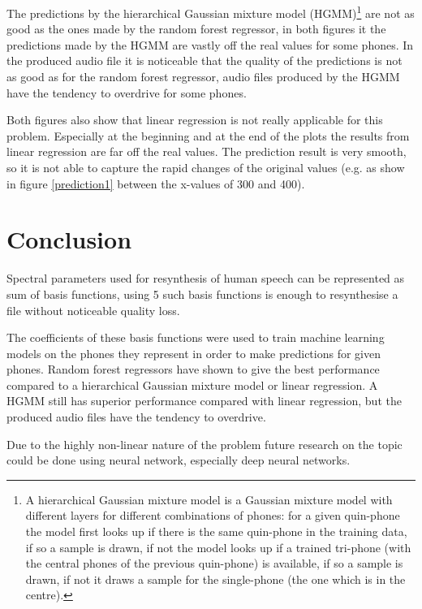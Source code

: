 \documentclass{article}
\begin{document}
The predictions by the hierarchical Gaussian mixture model (HGMM)\footnote{A 
hierarchical Gaussian mixture model is a Gaussian mixture model with different 
layers for different combinations of phones: for a given quin-phone the model 
first looks up if there is the same quin-phone in the training data, if so a 
sample is drawn, if not the model looks up if a trained tri-phone (with the 
central phones of the previous quin-phone) is available, if so a sample is 
drawn, if not it draws a sample for the single-phone  (the one which is in the 
centre).} are not as good as the ones made by the random forest regressor, in 
both figures it the predictions made by the HGMM are vastly off the real values 
for some phones. In the produced audio file it is noticeable that the quality 
of the predictions is not as good as for the random forest regressor, audio 
files produced by the HGMM have the tendency to overdrive for some phones.

Both figures also show that linear regression is not really applicable for this 
problem. Especially at the beginning and at the end of the plots the results 
from linear regression are far off the real values. The prediction result is 
very smooth, so it is not able to capture the rapid changes of the original 
values (e.g. as show in figure \ref{prediction1} between the x-values of 300 
and 400).

\section{Conclusion}
Spectral parameters used for resynthesis of human speech can be represented as 
sum of basis functions, using 5 such basis functions is enough to resynthesise 
a file without noticeable quality loss.

The coefficients of these basis functions were used to train machine learning 
models on the phones they represent in order to make predictions for given 
phones. Random forest regressors have shown to give the best performance 
compared to a hierarchical Gaussian mixture model or linear regression. A HGMM 
still has superior performance compared with linear regression, but the 
produced audio files have the tendency to overdrive.

Due to the highly non-linear nature of the problem future research on the topic 
could be done using neural network, especially deep neural networks.



\end{document}
